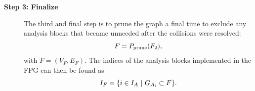 \begin{description}
    \item[\bf{Step 3: Finalize}] 
        The third and final step is to prune the graph a final time to exclude any analysis blocks that became unneeded after the collisions were resolved:
    \begin{equation}
        F = P_\textrm{prune}(F_2),
    \end{equation}
        with $F = (V_F,E_F)$.
        The indices of the analysis blocks implemented in the FPG can then be found as
    \begin{equation}
        I_F = \{ i \in I_A \ | \  G_{A_i} \subset F \}.
    \end{equation}
%
%

    \end{description}


